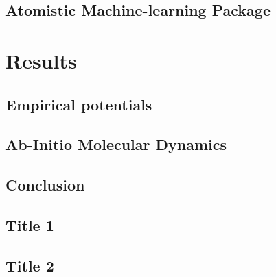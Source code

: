 \documentclass[12pt]{report}
\begin{document}
\chapter{Atomistic Machine-learning Package}


\part{Results}

\chapter{Empirical potentials}


\chapter{Ab-Initio Molecular Dynamics}


\chapter{Conclusion}


\begin{appendices}

\chapter{Title 1}

\chapter{Title 2}

\end{appendices}

\printbibliography
\end{document}
